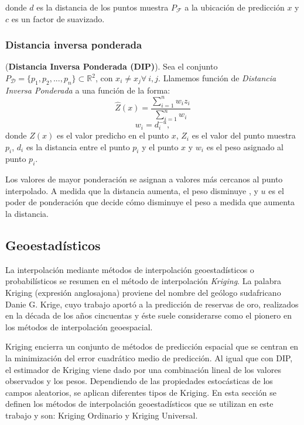 donde $d$ es la distancia de los puntos muestra $P_{\mathcal{F}}$ a la ubicación de predicción $x$ y $c$ es un factor de suavizado.






\subsubsection{Distancia inversa ponderada}



\begin{defn} (\textbf{Distancia Inversa Ponderada (DIP)}). Sea el conjunto $P_{\mathcal{D}} = \{ p_{1}, p_{2}, ..., p_{n} \} \subset \mathbb{R}^{2}$, con $x_{i} \neq x_{j} \forall \ i, j$. Llamemos función de \textit{Distancia Inversa Ponderada} a una función de la forma:
\begin{equation}
\hat{Z}(x)= \frac{\sum_{i=1}^{n} w_{i}z_{i}}{\sum_{i=1}^{n} w_{i}}
\end{equation}
\[ w_{i}=d_{i}^{-u}, \]
donde $Z(x)$ es el valor predicho en el punto $x$, $Z_{i}$ es el valor del punto muestra $p_{i}$, $d_{i}$ es la distancia entre el punto $p_{i}$ y el punto $x$ y $w_{i}$ es el peso asignado al punto $p_{i}$.
\end{defn}

Los valores de mayor ponderación se asignan a valores más cercanos al punto interpolado. A medida que la distancia aumenta, el peso disminuye \citep{shepard}, y $u$ es el poder de ponderación que decide cómo disminuye el peso a medida que aumenta la distancia.





\subsection{Geoestadísticos}

La interpolación mediante métodos de interpolación geoestadísticos o probabilísticos se resumen en el método de interpolación \textit{Kriging}. La palabra Kriging (expresión anglosajona) proviene del nombre del geólogo sudafricano Danie G. Krige, cuyo trabajo aportó a la predicción de reservas de oro, realizados en la década de los años cincuentas y éste suele considerarse como el pionero en los métodos de interpolación geoespacial. 

Kriging encierra un conjunto de métodos de predicción espacial que se centran en la minimización del error cuadrático medio de predicción. Al igual que con DIP, el estimador de Kriging viene dado por una combinación lineal de los valores observados y los pesos. Dependiendo de las propiedades estocásticas de los campos aleatorios, se aplican diferentes tipos de Kriging. En esta sección se definen los métodos de interpolación geoestadísticos que se utilizan en este trabajo y son: Kriging Ordinario y Kriging Universal.



